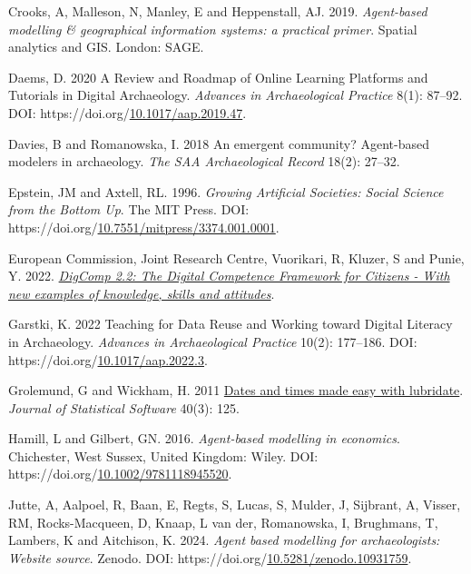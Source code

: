 \documentclass[
]{article}
\newlength{\cslhangindent}
\newlength{\cslentryspacingunit} %
\newenvironment{CSLReferences}[2] %
 {%
  \setlength{\parindent}{0pt}
  \ifodd #1
  \let\oldpar\par
  \def\par{\hangindent=\cslhangindent\oldpar}
  \fi
  \setlength{\parskip}{#2\cslentryspacingunit}
 }%
 {}
\begin{document}
\begin{CSLReferences}{1}{0}
\leavevmode{}%
Crooks, A, Malleson, N, Manley, E and Heppenstall, AJ. 2019. \emph{Agent-based modelling \& geographical information systems: a practical primer}. Spatial analytics and GIS. London: SAGE.

\leavevmode{}%
Daems, D. 2020 A Review and Roadmap of Online Learning Platforms and Tutorials in Digital Archaeology. \emph{Advances in Archaeological Practice} 8(1): 87--92. DOI: https://doi.org/\href{https://doi.org/10.1017/aap.2019.47}{10.1017/aap.2019.47}.

\leavevmode{}%
Davies, B and Romanowska, I. 2018 An emergent community? Agent-based modelers in archaeology. \emph{The SAA Archaeological Record} 18(2): 27--32.

\leavevmode{}%
Epstein, JM and Axtell, RL. 1996. \emph{Growing Artificial Societies: Social Science from the Bottom Up}. The MIT Press. DOI: https://doi.org/\href{https://doi.org/10.7551/mitpress/3374.001.0001}{10.7551/mitpress/3374.001.0001}.

\leavevmode{}%
European Commission, Joint Research Centre, Vuorikari, R, Kluzer, S and Punie, Y. 2022. \emph{\href{https://data.europa.eu/doi/10.2760/115376}{DigComp 2.2: The Digital Competence Framework for Citizens - With new examples of knowledge, skills and attitudes}}.

\leavevmode{}%
Garstki, K. 2022 Teaching for Data Reuse and Working toward Digital Literacy in Archaeology. \emph{Advances in Archaeological Practice} 10(2): 177--186. DOI: https://doi.org/\href{https://doi.org/10.1017/aap.2022.3}{10.1017/aap.2022.3}.

\leavevmode{}%
Grolemund, G and Wickham, H. 2011 \href{https://www.jstatsoft.org/v40/i03/}{Dates and times made easy with lubridate}. \emph{Journal of Statistical Software} 40(3): 125.

\leavevmode{}%
Hamill, L and Gilbert, GN. 2016. \emph{Agent-based modelling in economics}. Chichester, West Sussex, United Kingdom: Wiley. DOI: https://doi.org/\href{https://doi.org/10.1002/9781118945520}{10.1002/9781118945520}.

\leavevmode{}%
Jutte, A, Aalpoel, R, Baan, E, Regts, S, Lucas, S, Mulder, J, Sijbrant, A, Visser, RM, Rocks-Macqueen, D, Knaap, L van der, Romanowska, I, Brughmans, T, Lambers, K and Aitchison, K. 2024. \emph{Agent based modelling for archaeologists: Website source}. Zenodo. DOI: https://doi.org/\href{https://doi.org/10.5281/zenodo.10931759}{10.5281/zenodo.10931759}.


\end{CSLReferences}
\end{document}
